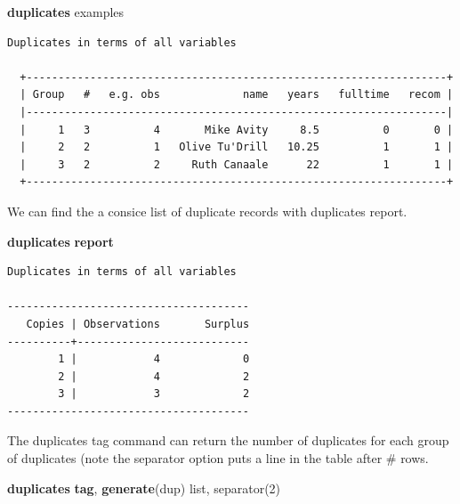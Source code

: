 \documentclass[
]{book}
\newenvironment{Shaded}{\begin{snugshade}}{\end{snugshade}}
\newcommand{\FunctionTok}[1]{\textcolor[rgb]{0.13,0.29,0.53}{\textbf{#1}}}
\newcommand{\KeywordTok}[1]{\textcolor[rgb]{0.13,0.29,0.53}{\textbf{#1}}}
\newcommand{\NormalTok}[1]{#1}
\newcommand{\OtherTok}[1]{\textcolor[rgb]{0.56,0.35,0.01}{#1}}
\begin{document}
\begin{Shaded}
\begin{Highlighting}[]
\KeywordTok{duplicates}\NormalTok{ examples }
\end{Highlighting}
\end{Shaded}

\begin{verbatim}
Duplicates in terms of all variables

  +------------------------------------------------------------------+
  | Group   #   e.g. obs             name   years   fulltime   recom |
  |------------------------------------------------------------------|
  |     1   3          4       Mike Avity     8.5          0       0 |
  |     2   2          1   Olive Tu'Drill   10.25          1       1 |
  |     3   2          2     Ruth Canaale      22          1       1 |
  +------------------------------------------------------------------+
\end{verbatim}

We can find the a consice list of duplicate records with duplicates report.

\begin{Shaded}
\begin{Highlighting}[]
\KeywordTok{duplicates} \KeywordTok{report}
\end{Highlighting}
\end{Shaded}

\begin{verbatim}
Duplicates in terms of all variables

--------------------------------------
   Copies | Observations       Surplus
----------+---------------------------
        1 |            4             0
        2 |            4             2
        3 |            3             2
--------------------------------------
\end{verbatim}

The duplicates tag command can return the number of duplicates for each group of duplicates (note the separator option puts a line in the table after \# rows.

\begin{Shaded}
\begin{Highlighting}[]
\KeywordTok{duplicates} \FunctionTok{tag}\NormalTok{, }\KeywordTok{generate}\NormalTok{(dup)}
\OtherTok{list}\NormalTok{, separator(2)}
\end{Highlighting}
\end{Shaded}
\end{document}
